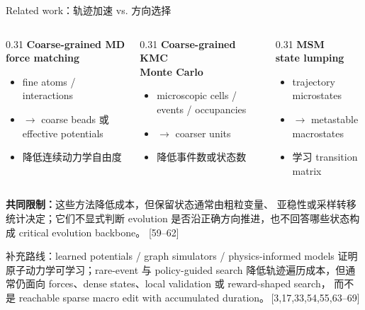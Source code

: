 \documentclass[aspectratio=43,10pt]{beamer}
\newcommand{\hl}[1]{\textcolor{thuPurple}{\textbf{#1}}}
\newcommand{\smallgray}[1]{{\scriptsize\textcolor{muted}{#1}}}
\newcommand{\tightitems}{\setlength{\itemsep}{0.35em}}
\begin{document}
\begin{frame}{Related work：轨迹加速 vs. 方向选择}
  \small
  \begin{columns}[T,onlytextwidth]
    \begin{column}{0.31\textwidth}
      \textbf{Coarse-grained MD\\force matching}
      \begin{itemize}
        \tightitems
        \item fine atoms / interactions
        \item \(\rightarrow\) coarse beads 或 effective potentials
        \item 降低连续动力学自由度
      \end{itemize}
    \end{column}
    \begin{column}{0.31\textwidth}
      \textbf{Coarse-grained KMC\\Monte Carlo}
      \begin{itemize}
        \tightitems
        \item microscopic cells / events / occupancies
        \item \(\rightarrow\) coarser units
        \item 降低事件数或状态数
      \end{itemize}
    \end{column}
    \begin{column}{0.31\textwidth}
      \textbf{MSM\\state lumping}
      \begin{itemize}
        \tightitems
        \item trajectory microstates
        \item \(\rightarrow\) metastable macrostates
        \item 学习 transition matrix
      \end{itemize}
    \end{column}
  \end{columns}
  \vspace{0.28cm}
  \begin{center}
    \begin{minipage}{0.91\linewidth}
      \small
      \hl{共同限制：}这些方法降低成本，但保留状态通常由粗粒变量、
      亚稳性或采样转移统计决定；它们不显式判断 evolution
      是否沿正确方向推进，也不回答哪些状态构成 critical evolution backbone。
      \smallgray{[59--62]}
    \end{minipage}
  \end{center}
  \vspace{0.18cm}
  {\scriptsize\textcolor{muted}{补充路线：learned potentials / graph simulators /
  physics-informed models 证明原子动力学可学习；rare-event 与 policy-guided search
  降低轨迹遍历成本，但通常仍面向 forces、dense states、local validation 或 reward-shaped search，
  而不是 reachable sparse macro edit with accumulated duration。\,[3,17,33,54,55,63--69]}}
\end{frame}
\end{document}

